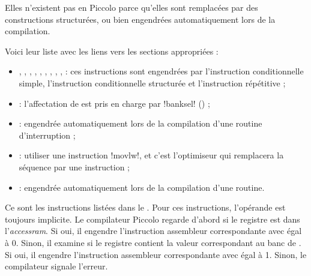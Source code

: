 Elles n’existent pas en Piccolo parce qu’elles sont remplacées par des constructions structurées, ou bien engendrées automatiquement lors de la compilation.

Voici leur liste avec les liens vers les sections appropriées :\begin{itemize}
  \item {}, , , , , , , , ,  : ces instructions sont engendrées par l’instruction conditionnelle simple, l’instruction conditionnelle structurée et l’instruction répétitive ;
  \item {} : l’affectation de  est pris en charge par \pic!banksel! () ;
  \item {} : engendrée automatiquement lors de la compilation d’une routine d’interruption ;
  \item {} : utiliser une instruction \pic!movlw!, et c’est l’optimiseur qui remplacera la séquence  par une instruction  ;
  \item {} : engendrée automatiquement lors de la compilation d’une routine.

\end{itemize}








Ce sont les instructions listées dans le . Pour ces instructions, l'opérande  est toujours implicite. Le compilateur Piccolo regarde d'abord si le registre  est dans l'\emph{accessram}. Si oui, il engendre l'instruction assembleur correspondante avec  égal à 0. Sinon, il examine si le registre  contient la valeur correspondant au banc de . Si oui, il engendre l'instruction assembleur correspondante avec  égal à 1. Sinon, le compilateur signale l'erreur.



